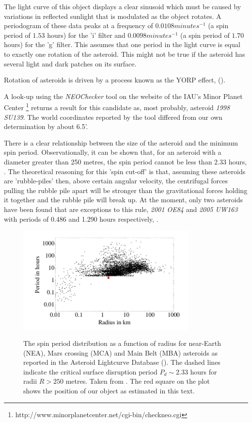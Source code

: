   The light curve of this object displays a clear sinusoid which must be caused by variations in reflected sunlight that is modulated as the object rotates. A periodogram of these data peaks at a frequency of $0.0108 minutes^{-1}$ (a spin period of $1.53$ hours) for the 'i' filter and $0.0098 minutes^{-1}$ (a spin period of $1.70$ hours) for the 'g' filter. This assumes that one period in the light curve is equal to exactly one rotation of the asteroid. This might not be true if the asteroid has several light and dark patches on its surface. 

  Rotation of asteroids is driven by a process known as the YORP effect, (\cite{yorpeffect}). 

  A look-up using the \emph{NEOChecker} tool on the website of the IAU's Minor Planet Center \footnote{http://www.minorplanetcenter.net/cgi-bin/checkneo.cgi} returns a result for this candidate as, most probably, asteroid \emph{1998 SU139}. The world coordinates reported by the tool differed from our own determination by about 6.5'. 

  There is a clear relationship between the size of the asteroid and the minimum spin period. Observationally, it can be shown that, for an asteroid with a diameter greater than 250 metres, the spin period cannot be less than 2.33 hours, \cite{Jacobson2014}. The theoretical reasoning for this 'spin cut-off'  is that, assuming these asteroids are 'rubble-piles' then, above certain angular velocity, the centrifugal forces pulling the rubble pile apart will be stronger than the gravitational forces holding it together and the rubble pile will break up. At the moment, only two asteroids have been found that are exceptions to this rule, \emph{2001 OE84} and \emph{2005 UW163} with periods of 0.486 and 1.290 hours respectively, \cite{Chang2014}. 

  \begin{figure}
    \center
    \includegraphics[width=90mm]{images/jacobson-asteroid-rotation-dot.png} 
    \label{fig:2005-05-10-run012}
    \caption{The spin period distribution as a function of radius for near-Earth (NEA), Mars crossing (MCA) and Main Belt (MBA) asteroids as reported in the Asteroid Lightcurve Database (\cite{2009Icar..202..134W}). The dashed lines indicate the critical surface disruption period $P_d \sim 2.33$ hours for radii $R > 250$ metres. Taken from \cite{Jacobson2014}. The red square on the plot shows the position of our object as estimated in this text. 
}
  \end{figure}
  


